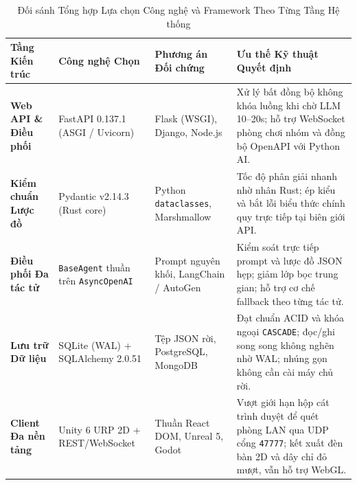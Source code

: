 \begin{table}[H]
\centering
\caption{Đối sánh Tổng hợp Lựa chọn Công nghệ và Framework Theo Từng Tầng Hệ thống}
\label{tab:framework_comparison}
\begin{tabularx}{\textwidth}{p{2.6cm} p{3.0cm} p{4.0cm} X}
\toprule
\textbf{Tầng Kiến trúc} & \textbf{Công nghệ Chọn} & \textbf{Phương án Đối chứng} & \textbf{Ưu thế Kỹ thuật Quyết định} \\
\midrule
\textbf{Web API \& Điều phối} & FastAPI 0.137.1 (ASGI / Uvicorn) & Flask (WSGI), Django, Node.js & Xử lý bất đồng bộ không khóa luồng khi chờ LLM 10--20s; hỗ trợ WebSocket phòng chơi nhóm và đồng bộ OpenAPI với Python AI. \\
\textbf{Kiểm chuẩn Lược đồ} & Pydantic v2.14.3 (Rust core) & Python \texttt{dataclasses}, Marshmallow & Tốc độ phân giải nhanh nhờ nhân Rust; ép kiểu và bắt lỗi biểu thức chính quy trực tiếp tại biên giới API. \\
\textbf{Điều phối Đa tác tử} & \texttt{BaseAgent} thuần trên \texttt{AsyncOpenAI} & Prompt nguyên khối, LangChain / AutoGen & Kiểm soát trực tiếp prompt và lược đồ JSON hẹp; giảm lớp bọc trung gian; hỗ trợ cơ chế fallback theo từng tác tử. \\
\textbf{Lưu trữ Dữ liệu} & SQLite (WAL) + SQLAlchemy 2.0.51 & Tệp JSON rời, PostgreSQL, MongoDB & Đạt chuẩn ACID và khóa ngoại \texttt{CASCADE}; đọc/ghi song song không nghẽn nhờ WAL; nhúng gọn không cần cài máy chủ rời. \\
\textbf{Client Đa nền tảng} & Unity 6 URP 2D + REST/WebSocket & Thuần React DOM, Unreal 5, Godot & Vượt giới hạn hộp cát trình duyệt để quét phòng LAN qua UDP cổng \texttt{47777}; kết xuất đèn bàn 2D và dây chỉ đỏ mượt, vẫn hỗ trợ WebGL. \\
\bottomrule
\end{tabularx}
\end{table}

